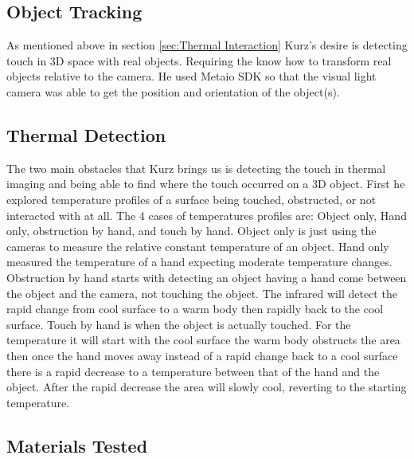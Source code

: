 \documentclass{sig-alternate}
\begin{document}

\subsection{Object Tracking}
\label{Object Tracking}

As mentioned above in section \ref{sec:Thermal Interaction}  Kurz's desire is detecting touch in 3D space with real objects. Requiring the know how to transform real objects relative to the camera. He used Metaio SDK so that the visual light camera was able to get the position and orientation of the object(s). 


\subsection{Thermal Detection}
\label{Thermal Detection}
The two main obstacles that Kurz brings us is detecting the touch in thermal imaging and being able to find where the touch occurred on a 3D object. First he explored temperature profiles of a surface being touched, obstructed, or not interacted with at all. The 4 cases of temperatures profiles are: Object only, Hand only, obstruction by hand, and touch by hand. Object only is just using the cameras to measure the relative constant temperature of an object. Hand only measured the temperature of a hand expecting moderate temperature changes. Obstruction by hand starts with detecting an object having a hand come between the object and the camera, not touching the object. The infrared will detect the rapid change from cool surface to a warm body then rapidly back to the cool surface. Touch by hand is when the object is actually touched. For the temperature it will start with the cool surface the warm body obstructs the area then once the hand moves away instead of a rapid change back to a cool surface there is a rapid decrease to a temperature between that of the hand and the object. After the rapid decrease the area will slowly cool, reverting to the starting temperature.


\subsection{Materials Tested}
\label{Materials Tested}
\end{document}
